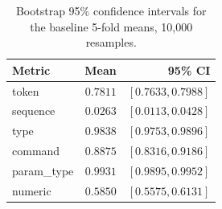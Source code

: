 \begin{table}[h]
\centering
\caption{Bootstrap 95\% confidence intervals for the baseline 5-fold means, 10{,}000 resamples.}
\label{tab:bootstrap_ci}
\begin{tabular}{l r r}
\toprule
Metric & Mean & 95\% CI \\
\midrule
token & $0.7811$ & $[0.7633, 0.7988]$ \\
sequence & $0.0263$ & $[0.0113, 0.0428]$ \\
type & $0.9838$ & $[0.9753, 0.9896]$ \\
command & $0.8875$ & $[0.8316, 0.9186]$ \\
param\_type & $0.9931$ & $[0.9895, 0.9952]$ \\
numeric & $0.5850$ & $[0.5575, 0.6131]$ \\
\bottomrule
\end{tabular}
\end{table}